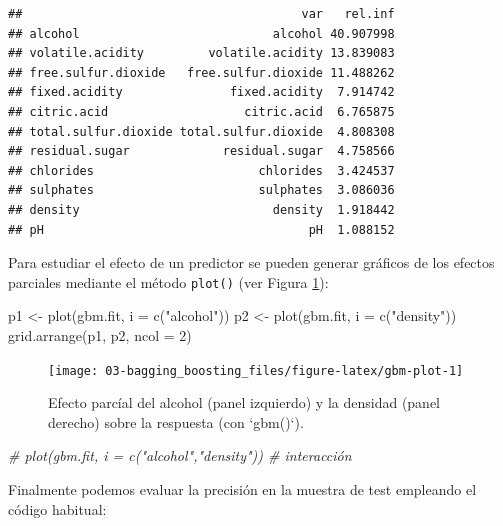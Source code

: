 \documentclass[
  spanish,
]{book}
\newenvironment{Shaded}{\begin{snugshade}}{\end{snugshade}}
\newcommand{\AttributeTok}[1]{\textcolor[rgb]{0.77,0.63,0.00}{#1}}
\newcommand{\CommentTok}[1]{\textcolor[rgb]{0.56,0.35,0.01}{\textit{#1}}}
\newcommand{\DecValTok}[1]{\textcolor[rgb]{0.00,0.00,0.81}{#1}}
\newcommand{\FunctionTok}[1]{\textcolor[rgb]{0.00,0.00,0.00}{#1}}
\newcommand{\NormalTok}[1]{#1}
\newcommand{\OtherTok}[1]{\textcolor[rgb]{0.56,0.35,0.01}{#1}}
\newcommand{\StringTok}[1]{\textcolor[rgb]{0.31,0.60,0.02}{#1}}
\theoremstyle{break}
\theoremstyle{definition}
\theoremstyle{definition}
\theoremstyle{definition}
\theoremstyle{definition}
\theoremstyle{remark}
\begin{document}
\begin{verbatim}
##                                       var   rel.inf
## alcohol                           alcohol 40.907998
## volatile.acidity         volatile.acidity 13.839083
## free.sulfur.dioxide   free.sulfur.dioxide 11.488262
## fixed.acidity               fixed.acidity  7.914742
## citric.acid                   citric.acid  6.765875
## total.sulfur.dioxide total.sulfur.dioxide  4.808308
## residual.sugar             residual.sugar  4.758566
## chlorides                       chlorides  3.424537
## sulphates                       sulphates  3.086036
## density                           density  1.918442
## pH                                     pH  1.088152
\end{verbatim}

Para estudiar el efecto de un predictor se pueden generar gráficos de los efectos parciales mediante el método \texttt{plot()} (ver Figura \ref{fig:gbm-plot}):

\begin{Shaded}
\begin{Highlighting}[]
\NormalTok{p1 }\OtherTok{\textless{}{-}} \FunctionTok{plot}\NormalTok{(gbm.fit, }\AttributeTok{i =} \FunctionTok{c}\NormalTok{(}\StringTok{"alcohol"}\NormalTok{))}
\NormalTok{p2 }\OtherTok{\textless{}{-}} \FunctionTok{plot}\NormalTok{(gbm.fit, }\AttributeTok{i =} \FunctionTok{c}\NormalTok{(}\StringTok{"density"}\NormalTok{))}
\FunctionTok{grid.arrange}\NormalTok{(p1, p2, }\AttributeTok{ncol =} \DecValTok{2}\NormalTok{)}
\end{Highlighting}
\end{Shaded}

\begin{figure}[!htb]

{\centering \texttt{[image: 03-bagging\_boosting\_files/figure-latex/gbm-plot-1]} 

}

\caption{Efecto parcíal del alcohol (panel izquierdo) y la densidad (panel derecho) sobre la respuesta (con `gbm()`).}\label{fig:gbm-plot}
\end{figure}

\begin{Shaded}
\begin{Highlighting}[]
\CommentTok{\# plot(gbm.fit, i = c("alcohol","density")) \# interacción}
\end{Highlighting}
\end{Shaded}

Finalmente podemos evaluar la precisión en la muestra de test empleando el código habitual:
\end{document}
